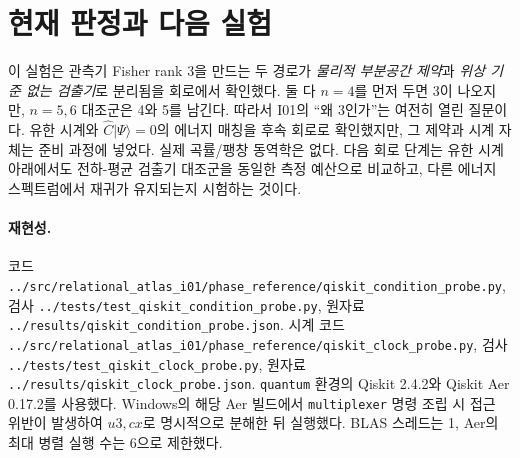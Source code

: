 \documentclass[11pt,a4paper]{article}
\begin{document}
\section{현재 판정과 다음 실험}
이 실험은 관측기 Fisher rank 3을 만드는 두 경로가
\emph{물리적 부분공간 제약}과 \emph{위상 기준 없는 검출기}로
분리됨을 회로에서 확인했다. 둘 다 $n=4$를 먼저 두면 3이 나오지만,
$n=5,6$ 대조군은 4와 5를 남긴다. 따라서 I01의 ``왜 3인가''는
여전히 열린 질문이다. 유한 시계와
$\hat C|\Psi\rangle=0$의 에너지 매칭을 후속 회로로 확인했지만,
그 제약과 시계 자체는 준비 과정에 넣었다. 실제 곡률/팽창 동역학은
없다. 다음 회로 단계는 유한 시계 아래에서도 전하-평균 검출기
대조군을 동일한 측정 예산으로 비교하고, 다른 에너지 스펙트럼에서
재귀가 유지되는지 시험하는 것이다.

\paragraph{재현성.} 코드 \texttt{../src/relational\_atlas\_i01/phase\_reference/qiskit\_condition\_probe.py},
검사 \texttt{../tests/test\_qiskit\_condition\_probe.py},
원자료 \texttt{../results/qiskit\_condition\_probe.json}.
시계 코드 \texttt{../src/relational\_atlas\_i01/phase\_reference/qiskit\_clock\_probe.py},
검사 \texttt{../tests/test\_qiskit\_clock\_probe.py},
원자료 \texttt{../results/qiskit\_clock\_probe.json}.
\texttt{quantum} 환경의 Qiskit 2.4.2와 Qiskit Aer 0.17.2를 사용했다.
Windows의 해당 Aer 빌드에서 \texttt{multiplexer} 명령 조립 시
접근 위반이 발생하여 $u3,cx$로 명시적으로 분해한 뒤 실행했다.
BLAS 스레드는 1, Aer의 최대 병렬 실행 수는 6으로 제한했다.
\end{document}
